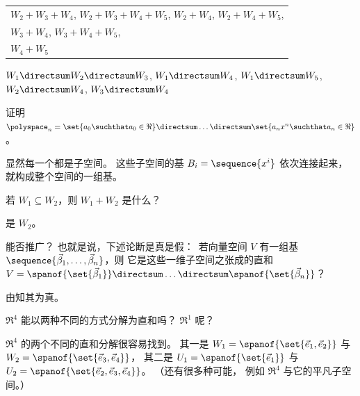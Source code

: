 \begin{exercises}
\begin{answer}
\begin{exparts}
\begin{center}
\begin{tabular}{l}
              $W_2+W_3+W_4$, 
              $W_2+W_3+W_4+W_5$,     
              $W_2+W_4$, 
              $W_2+W_4+W_5$,         \\ 
              $W_3+W_4$, 
              $W_3+W_4+W_5$,         \\ 
              $W_4+W_5$ 
          \end{tabular}
         \end{center}
     \partsitem
       $W_1\directsum W_2\directsum W_3$,    
       $W_1\directsum W_4$,    
       $W_1\directsum W_5$,    
       $W_2\directsum W_4$,    
       $W_3\directsum W_4$    
     \end{exparts}
    \end{answer}
  \recommended \item
    证明 \( \polyspace_n=\set{a_0 \suchthat a_0\in\Re}\directsum\dots
                              \directsum\set{a_nx^n\suchthat a_n\in\Re} \)。
    \begin{answer}
      显然每一个都是子空间。
      这些子空间的基 \( B_i=\sequence{x^i} \) 依次连接起来，
      就构成整个空间的一组基。  
    \end{answer}
  \item 
    若 \( W_1\subseteq W_2 \)，则 \( W_1+W_2 \) 是什么？
    \begin{answer}
       是 \( W_2 \)。  
    \end{answer}
  \item 
     能否推广？
    也就是说，下述论断是真是假：~若向量空间 \( V \) 有一组基
    \( \sequence{\vec{\beta}_1,\dots ,\vec{\beta}_n} \)，则
    它是这些一维子空间之张成的直和
    \( V=\spanof{\set{\vec{\beta}_1}}\directsum\dots
           \directsum\spanof{\set{\vec{\beta}_n}} \)？
    \begin{answer}
      由知其为真。  
    \end{answer}
  \item 
    \( \Re^4 \) 能以两种不同的方式分解为直和吗？
    \( \Re^1 \) 呢？
    \begin{answer}
      \( \Re^4 \) 的两个不同的直和分解很容易找到。
      其一是
      \( W_1=\spanof{\set{\vec{e}_1,\vec{e}_2}} \) 与
      \( W_2=\spanof{\set{\vec{e}_3,\vec{e}_4}} \)，
      其二是
      \( U_1=\spanof{\set{\vec{e}_1}} \) 与
      \( U_2=\spanof{\set{\vec{e}_2,\vec{e}_3,\vec{e}_4}} \)。
      （还有很多种可能，
      例如 \( \Re^4 \) 与它的平凡子空间。）


\end{answer}
\end{exercises}
